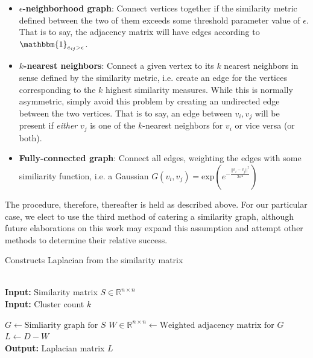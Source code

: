 \documentclass[journal]{IEEEtran}
\begin{document}
\begin{itemize}
    \item \textbf{$\epsilon$-neighborhood graph}: Connect vertices together if the similarity metric defined between the two of them exceeds some threshold parameter value of $\epsilon$. That is to say, the adjacency matrix will have edges according to $\mathbbm{1}_{e_{ij}>\epsilon}$.
    \item \textbf{$k$-nearest neighbors}: Connect a given vertex to its $k$ nearest neighbors in sense defined by the similarity metric, i.e. create an edge for the vertices corresponding to the $k$ highest similarity measures. While this is normally asymmetric, simply avoid this problem by creating an undirected edge between the two vertices. That is to say, an edge between $v_i,v_j$ will be present if \textit{either} $v_j$ is one of the $k$-nearest neighbors for $v_i$ or vice versa (or both).
    \item \textbf{Fully-connected graph}: Connect all edges, weighting the edges with some similiarity function, i.e. a Gaussian $G(v_i,v_j) = \text{exp}\left(e^{-\frac{|| v_i - v_j ||^2}{2\sigma^2}}\right)$
\end{itemize}

The procedure, therefore, thereafter is held as described above. For our particular case, we elect to use the third method of catering a similarity graph, although future elaborations on this work may expand this assumption and attempt other methods to determine their relative success. 

\begin{algorithm}
    
\caption{Constructs Laplacian from the similarity matrix}\label{alg:laplacian}
\begin{algorithmic}[1]
 \\
\textbf{Input:} Similarity matrix $S\in\mathbb{R}^{n\times n}$ \\
\textbf{Input:} Cluster count $k$

\State $G \gets \text{Simliarity graph for } S$
\State $W\in\mathbb{R}^{n\times n} \gets \text{Weighted adjacency matrix for } G$ \\
\State $L \gets D - W$ \\

\textbf{Output:} Laplacian matrix $L$
\EndProcedure
\end{algorithmic}
\end{algorithm}
\end{document}
